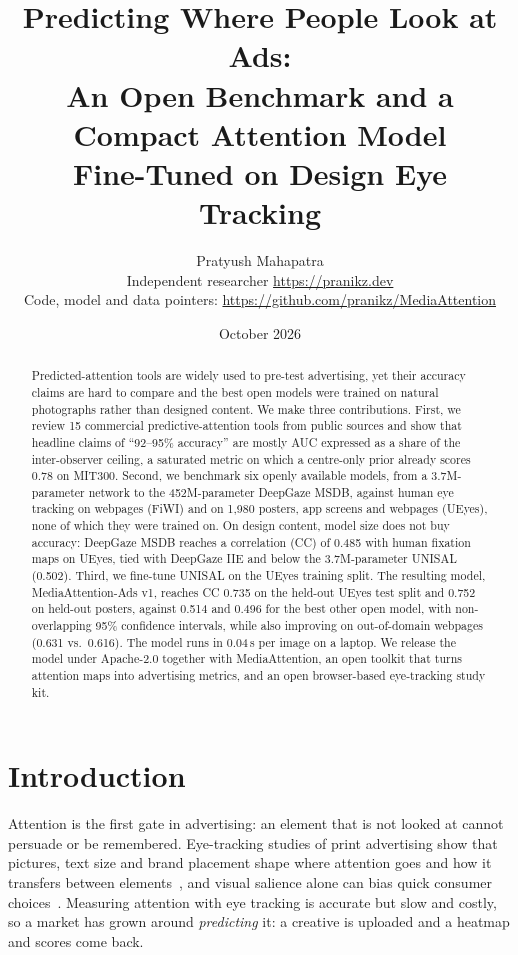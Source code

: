 \documentclass[11pt]{article}
\title{Predicting Where People Look at Ads:\\An Open Benchmark and a Compact Attention Model\\Fine-Tuned on Design Eye Tracking}
\author{Pratyush Mahapatra\\[2pt]
\small Independent researcher \quad \url{https://pranikz.dev}\\[2pt]
\small Code, model and data pointers: \url{https://github.com/pranikz/MediaAttention}}
\date{October 2026}
\begin{document}
\maketitle

\begin{abstract}
Predicted-attention tools are widely used to pre-test advertising, yet their accuracy claims are hard to compare and
the best open models were trained on natural photographs rather than designed content. We make three contributions.
First, we review 15 commercial predictive-attention tools from public sources and show that headline claims of
``92--95\% accuracy'' are mostly AUC expressed as a share of the inter-observer ceiling, a saturated metric on which a
centre-only prior already scores 0.78 on MIT300. Second, we benchmark six openly available models, from a 3.7M-parameter
network to the 452M-parameter DeepGaze MSDB, against human eye tracking on webpages (FiWI) and on 1,980 posters, app
screens and webpages (UEyes), none of which they were trained on. On design content, model size does not buy accuracy:
DeepGaze MSDB reaches a correlation (CC) of 0.485 with human fixation maps on UEyes, tied with DeepGaze IIE and below
the 3.7M-parameter UNISAL (0.502). Third, we fine-tune UNISAL on the UEyes training split. The resulting model,
MediaAttention-Ads v1, reaches CC 0.735 on the held-out UEyes test split and 0.752 on held-out posters, against 0.514
and 0.496 for the best other open model, with non-overlapping 95\% confidence intervals, while also improving on
out-of-domain webpages (0.631 vs.\ 0.616). The model runs in 0.04\,s per image on a laptop. We release the model under
Apache-2.0 together with MediaAttention, an open toolkit that turns attention maps into advertising metrics, and an
open browser-based eye-tracking study kit.
\end{abstract}

\section{Introduction}
Attention is the first gate in advertising: an element that is not looked at cannot persuade or be remembered.
Eye-tracking studies of print advertising show that pictures, text size and brand placement shape where attention goes
and how it transfers between elements~\cite{pieters2004attention,pieters2010stopping}, and visual salience alone can bias
quick consumer choices~\cite{milosavljevic2012saliency}. Measuring attention with eye tracking is accurate but slow and
costly, so a market has grown around \emph{predicting} it: a creative is uploaded and a heatmap and scores come back.
\end{document}

